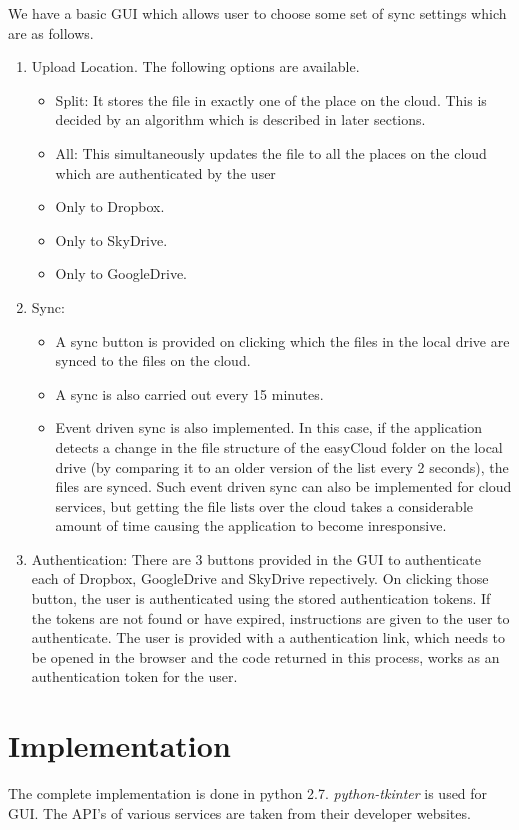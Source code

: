 \documentclass{article}
\begin{document}
We have a basic GUI which allows user to choose some set of sync settings which are as follows.
\begin{enumerate}
	\item Upload Location. The following options are available.
	\begin{itemize}
	\item Split: It stores the file in exactly one of the place on the cloud. This is decided by an algorithm which is described in later sections.
	\item All: This simultaneously updates the file to all the places on the cloud which are authenticated by the user
	\item Only to Dropbox.
	\item Only to SkyDrive.
	\item Only to GoogleDrive.
	\end{itemize}
	\item Sync:
	\begin{itemize}
	\item A sync button is provided on clicking which the files in the local drive are synced to the files on the cloud.
	\item A sync is also carried out every 15 minutes.
	\item Event driven sync is also implemented. In this case, if the application detects a change in the file structure of the easyCloud folder on the local drive (by comparing it to an older version of the list every 2 seconds), the files are synced. Such event driven sync can also be implemented for cloud services, but getting the file lists over the cloud takes a considerable amount of time causing the application to become inresponsive.
	\end{itemize}
	\item Authentication: There are 3 buttons provided in the GUI to authenticate each of Dropbox, GoogleDrive and SkyDrive repectively. On clicking those button, the user is authenticated using the stored authentication tokens. If the tokens are not found or have expired, instructions are given to the user to authenticate. The user is provided with a authentication link, which needs to be opened in the browser and the code returned in this process, works as an authentication token for the user.
\end{enumerate}

\section{Implementation}
The complete implementation is done in python 2.7. {\em python-tkinter} is used for GUI. The API's of various services are taken from their developer websites.
\end{document}
